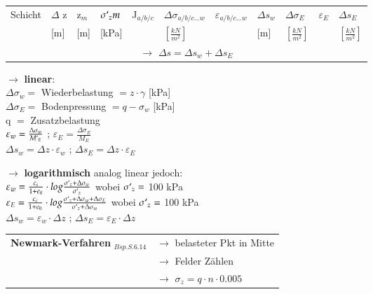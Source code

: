 	\begin{minipage}{\linewidth}
	\begin{tabular}{|l|l|l|l|l|l|l|l|l|l|l|}
		\hline
		Schicht	& $\Delta$ z	& z$_m$		& $\sigma`_zm$	& J$_{a/b/c}$	& $\Delta \sigma_{a/b/c...w}$ 	& $\varepsilon_{a/b/c...w}$ 	& $\Delta s_w$ & $\Delta \sigma_E$ & $\varepsilon_E$ & $\Delta s_E$	\\
		& [m]			& [m]		&  [kPa]		& 				& $\left[\frac{kN}{m^2}\right]$ &		& [m] 	& $\left[\frac{kN}{m^2}\right]$ &		 & $\left[\frac{kN}{m^2}\right]$ \\ \hline
		\multicolumn{11}{|c|}{$\rightarrow$ $\Delta s = \Delta s_w + \Delta s_E$} \\
	\end{tabular}
	
	\vspace{\baselineskip}
	\end{minipage}


\begin{minipage}{0.5\linewidth}
	$\rightarrow$ \textbf{linear}: \\
	$\Delta \sigma_w=$ Wiederbelastung $=z \cdot \gamma$ [kPa] \\
	$\Delta \sigma_E=$ Bodenpressung $=q - \sigma_w$ [kPa] \\
	q $=$ Zusatzbelastung \\
	$\varepsilon_w = \frac{\Delta \sigma_w}{M`_E}$ ; $\varepsilon_E = \frac{\Delta \sigma_E}{M_E}$ \\
	$\Delta s_w = \Delta z \cdot\varepsilon_w$ ; $\Delta s_E = \Delta z \cdot\varepsilon_E$\\
\end{minipage}	
\begin{minipage}{0.5\linewidth}
	$\rightarrow$ \textbf{logarithmisch} analog linear jedoch: \\
	$\varepsilon_w = \frac{c_s}{1 + e_0} \cdot log \frac{\sigma`_z + \Delta \sigma_w}{\sigma`_z}$ wobei $\sigma`_z =$ 100 kPa \\
	$\varepsilon_E = \frac{c_c}{1 + e_0} \cdot log \frac{\sigma`_z + \Delta \sigma_w + \Delta \sigma_E}{\sigma`_z + \Delta \sigma_w}$ wobei $\sigma`_z =$ 100 kPa \\
	$\Delta s_w= \varepsilon_w \cdot \Delta z$ ; $\Delta s_E= \varepsilon_E \cdot \Delta z$ \\
		\vspace{\baselineskip}
\end{minipage}





	\begin{minipage}{\linewidth}
		\vspace{\baselineskip}
		\begin{tabular}{ll}
		\textbf{Newmark-Verfahren} $_{Bsp. S. 6.14}$ & $\rightarrow$ belasteter Pkt in Mitte \\ 
										 & $\rightarrow$ Felder Zählen \\
										 & $\rightarrow$ $\sigma_z=q \cdot n \cdot 0.005$ \\
		\end{tabular}
		
	
	\end{minipage}
